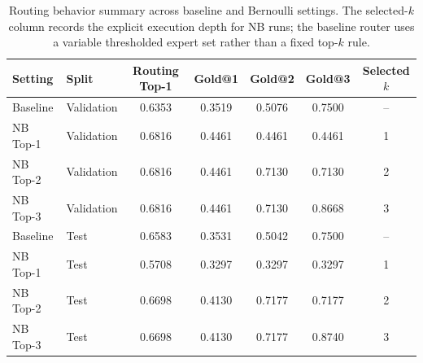 \begin{table}[t]
\centering
\caption{Routing behavior summary across baseline and Bernoulli settings. The selected-$k$ column records the explicit execution depth for NB runs; the baseline router uses a variable thresholded expert set rather than a fixed top-$k$ rule.}
\begin{tabular}{llccccc}
\toprule
Setting & Split & Routing Top-1 & Gold@1 & Gold@2 & Gold@3 & Selected $k$ \\
\midrule
Baseline & Validation & 0.6353 & 0.3519 & 0.5076 & 0.7500 & -- \\
NB Top-1 & Validation & 0.6816 & 0.4461 & 0.4461 & 0.4461 & 1 \\
NB Top-2 & Validation & 0.6816 & 0.4461 & 0.7130 & 0.7130 & 2 \\
NB Top-3 & Validation & 0.6816 & 0.4461 & 0.7130 & 0.8668 & 3 \\
Baseline & Test & 0.6583 & 0.3531 & 0.5042 & 0.7500 & -- \\
NB Top-1 & Test & 0.5708 & 0.3297 & 0.3297 & 0.3297 & 1 \\
NB Top-2 & Test & 0.6698 & 0.4130 & 0.7177 & 0.7177 & 2 \\
NB Top-3 & Test & 0.6698 & 0.4130 & 0.7177 & 0.8740 & 3 \\
\bottomrule
\end{tabular}
\end{table}
